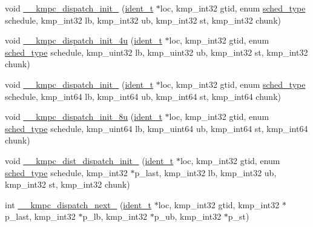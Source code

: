 \begin{DoxyCompactItemize}
\item 
void \hyperlink{group__WORK__SHARING_gae991c61cbe8e2942fe1f757a65442b26}{\-\_\-\-\_\-kmpc\-\_\-dispatch\-\_\-init\-\_} (\hyperlink{group__BASIC__TYPES_ga690fda6b92f039a72db263c6b4394ddb}{ident\-\_\-t} $\ast$loc, kmp\-\_\-int32 gtid, enum \hyperlink{group__WORK__SHARING_gadcaf200537aaa0218a60c398438f81be}{sched\-\_\-type} schedule, kmp\-\_\-int32 lb, kmp\-\_\-int32 ub, kmp\-\_\-int32 st, kmp\-\_\-int32 chunk)
\item 
void \hyperlink{group__WORK__SHARING_gaed75fbf8e655bc644d585a48e810bcfc}{\-\_\-\-\_\-kmpc\-\_\-dispatch\-\_\-init\-\_\-4u} (\hyperlink{group__BASIC__TYPES_ga690fda6b92f039a72db263c6b4394ddb}{ident\-\_\-t} $\ast$loc, kmp\-\_\-int32 gtid, enum \hyperlink{group__WORK__SHARING_gadcaf200537aaa0218a60c398438f81be}{sched\-\_\-type} schedule, kmp\-\_\-uint32 lb, kmp\-\_\-uint32 ub, kmp\-\_\-int32 st, kmp\-\_\-int32 chunk)
\item 
void \hyperlink{group__WORK__SHARING_gafb31932f7af41b5db5e7d80b21926853}{\-\_\-\-\_\-kmpc\-\_\-dispatch\-\_\-init\-\_} (\hyperlink{group__BASIC__TYPES_ga690fda6b92f039a72db263c6b4394ddb}{ident\-\_\-t} $\ast$loc, kmp\-\_\-int32 gtid, enum \hyperlink{group__WORK__SHARING_gadcaf200537aaa0218a60c398438f81be}{sched\-\_\-type} schedule, kmp\-\_\-int64 lb, kmp\-\_\-int64 ub, kmp\-\_\-int64 st, kmp\-\_\-int64 chunk)
\item 
void \hyperlink{group__WORK__SHARING_gaf047657f8ff072f15174f03ff80b4882}{\-\_\-\-\_\-kmpc\-\_\-dispatch\-\_\-init\-\_\-8u} (\hyperlink{group__BASIC__TYPES_ga690fda6b92f039a72db263c6b4394ddb}{ident\-\_\-t} $\ast$loc, kmp\-\_\-int32 gtid, enum \hyperlink{group__WORK__SHARING_gadcaf200537aaa0218a60c398438f81be}{sched\-\_\-type} schedule, kmp\-\_\-uint64 lb, kmp\-\_\-uint64 ub, kmp\-\_\-int64 st, kmp\-\_\-int64 chunk)
\item 
void \hyperlink{group__WORK__SHARING_ga9a4e5434d7a476580c6ef7ad2c776bb5}{\-\_\-\-\_\-kmpc\-\_\-dist\-\_\-dispatch\-\_\-init\-\_} (\hyperlink{group__BASIC__TYPES_ga690fda6b92f039a72db263c6b4394ddb}{ident\-\_\-t} $\ast$loc, kmp\-\_\-int32 gtid, enum \hyperlink{group__WORK__SHARING_gadcaf200537aaa0218a60c398438f81be}{sched\-\_\-type} schedule, kmp\-\_\-int32 $\ast$p\-\_\-last, kmp\-\_\-int32 lb, kmp\-\_\-int32 ub, kmp\-\_\-int32 st, kmp\-\_\-int32 chunk)
\item 
int \hyperlink{group__WORK__SHARING_ga5671ff45051907f76cc3d214e1de854b}{\-\_\-\-\_\-kmpc\-\_\-dispatch\-\_\-next\-\_} (\hyperlink{group__BASIC__TYPES_ga690fda6b92f039a72db263c6b4394ddb}{ident\-\_\-t} $\ast$loc, kmp\-\_\-int32 gtid, kmp\-\_\-int32 $\ast$p\-\_\-last, kmp\-\_\-int32 $\ast$p\-\_\-lb, kmp\-\_\-int32 $\ast$p\-\_\-ub, kmp\-\_\-int32 $\ast$p\-\_\-st)

\end{DoxyCompactItemize}
